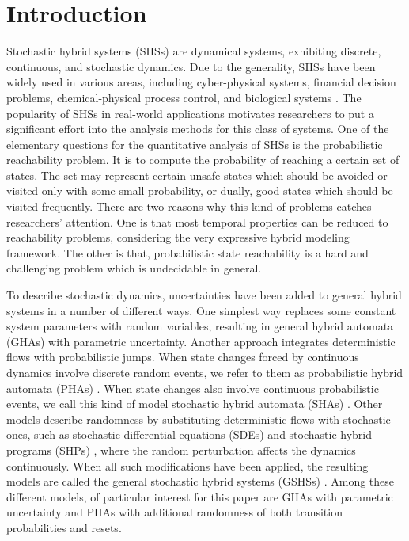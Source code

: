 \section{Introduction} 
Stochastic hybrid systems (SHSs) are dynamical systems, exhibiting discrete, continuous, and stochastic dynamics. Due to the generality, SHSs have been widely used in various areas, including cyber-physical systems, financial decision problems, chemical-physical process control, and biological systems \cite{blom2006stochastic}. The popularity of SHSs in real-world applications motivates researchers to put a significant effort into the analysis methods for this class of systems. One of the elementary questions for the quantitative analysis of SHSs is the probabilistic reachability problem. It is to compute the probability of reaching a certain set of states. The set may represent certain unsafe states which should be avoided or visited only with some small probability, or dually, good states which should be visited frequently. There are two reasons why this kind of problems catches researchers' attention. One is that most temporal properties can be reduced to reachability problems, considering the very expressive hybrid modeling framework. The other is that, probabilistic state reachability is a hard and challenging problem which is undecidable in general. 

To describe stochastic dynamics, uncertainties have been added to general hybrid systems in a number of different ways. One simplest way replaces some constant system parameters with random variables, resulting in general hybrid automata (GHAs) with parametric uncertainty. Another approach integrates deterministic flows with probabilistic jumps. When state changes forced by continuous dynamics involve discrete random events, we refer to them as probabilistic hybrid automata (PHAs) \cite{sproston2000decidable}. When state changes also involve continuous probabilistic events, we call this kind of model stochastic hybrid automata (SHAs) \cite{franzle2011measurability}. Other models describe randomness by substituting deterministic flows with stochastic ones, such as stochastic differential equations (SDEs) \cite{ludwiga1974sde} and stochastic hybrid programs (SHPs) \cite{platzer2011stochastic}, where the random perturbation affects the dynamics continuously. When all such modifications have been applied, the resulting models are called the general stochastic hybrid systems (GSHSs) \cite{hu2000towards}. Among these different models, of particular interest for this paper are GHAs with parametric uncertainty and PHAs with additional randomness of both transition probabilities and resets. 


